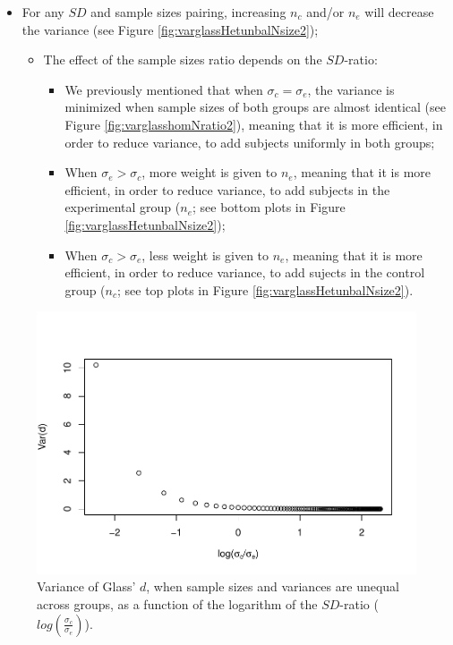 \documentclass[
  english,
  man,mask]{apa6}
\providecommand{\tightlist}{%
  \setlength{\itemsep}{0pt}\setlength{\parskip}{0pt}}
\begin{document}
\begin{itemize}
\item
  For any \(SD\) and sample sizes pairing, increasing \(n_c\) and/or \(n_e\) will decrease the variance (see Figure \ref{fig:varglassHetunbalNsize2});

  \begin{itemize}
  \tightlist
  \item
    The effect of the sample sizes ratio depends on the \(SD\)-ratio:

    \begin{itemize}
    \tightlist
    \item
      We previously mentioned that when \(\sigma_c=\sigma_e\), the variance is minimized when sample sizes of both groups are almost identical (see Figure \ref{fig:varglasshomNratio2}), meaning that it is more efficient, in order to reduce variance, to add subjects uniformly in both groups;\\
    \item
      When \(\sigma_e > \sigma_c\), more weight is given to \(n_e\), meaning that it is more efficient, in order to reduce variance, to add subjects in the experimental group (\(n_e\); see bottom plots in Figure \ref{fig:varglassHetunbalNsize2});\\
    \item
      When \(\sigma_c > \sigma_e\), less weight is given to \(n_e\), meaning that it is more efficient, in order to reduce variance, to add sujects in the control group (\(n_c\); see top plots in Figure \ref{fig:varglassHetunbalNsize2}).
    \end{itemize}
  \end{itemize}
\end{itemize}

\begin{figure}
\centering
\includegraphics{Theoretical-Variance-of-all-estimators-as-a-function-of-population-parameters_files/figure-latex/varglasshetunbalSDratio2-1.pdf}
\caption{\label{fig:varglasshetunbalSDratio2}Variance of Glass' \(d\), when sample sizes and variances are unequal across groups, as a function of the logarithm of the \(SD\)-ratio (\(log \left( \frac{\sigma_c}{\sigma_e} \right)\)).}
\end{figure}
\end{document}
